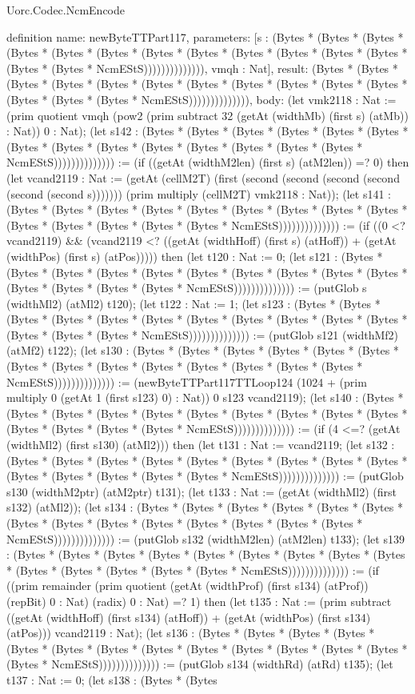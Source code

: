 \begin{lexlean}{Uorc.Codec.NcmEncode}
\begin{semanticmodule}
definition{
  name: newByteTTPart117,
  parameters: [s : (Bytes * (Bytes * (Bytes * (Bytes * (Bytes * (Bytes * (Bytes * (Bytes * (Bytes * (Bytes * (Bytes * (Bytes * (Bytes * (Bytes * NcmEStS)))))))))))))), vmqh : Nat],
  result: (Bytes * (Bytes * (Bytes * (Bytes * (Bytes * (Bytes * (Bytes * (Bytes * (Bytes * (Bytes * (Bytes * (Bytes * (Bytes * (Bytes * NcmEStS)))))))))))))),
  body: (let vmk2118 : Nat := (prim quotient vmqh (pow2 (prim subtract 32 (getAt (widthMb) (first s) (atMb)) : Nat)) 0 : Nat); (let s142 : (Bytes * (Bytes * (Bytes * (Bytes * (Bytes * (Bytes * (Bytes * (Bytes * (Bytes * (Bytes * (Bytes * (Bytes * (Bytes * (Bytes * NcmEStS)))))))))))))) := (if ((getAt (widthM2len) (first s) (atM2len)) =? 0) then (let vcand2119 : Nat := (getAt (cellM2T) (first (second (second (second (second (second (second s))))))) (prim multiply (cellM2T) vmk2118 : Nat)); (let s141 : (Bytes * (Bytes * (Bytes * (Bytes * (Bytes * (Bytes * (Bytes * (Bytes * (Bytes * (Bytes * (Bytes * (Bytes * (Bytes * (Bytes * NcmEStS)))))))))))))) := (if ((0 <? vcand2119) && (vcand2119 <? ((getAt (widthHoff) (first s) (atHoff)) + (getAt (widthPos) (first s) (atPos))))) then (let t120 : Nat := 0; (let s121 : (Bytes * (Bytes * (Bytes * (Bytes * (Bytes * (Bytes * (Bytes * (Bytes * (Bytes * (Bytes * (Bytes * (Bytes * (Bytes * (Bytes * NcmEStS)))))))))))))) := (putGlob s (widthMl2) (atMl2) t120); (let t122 : Nat := 1; (let s123 : (Bytes * (Bytes * (Bytes * (Bytes * (Bytes * (Bytes * (Bytes * (Bytes * (Bytes * (Bytes * (Bytes * (Bytes * (Bytes * (Bytes * NcmEStS)))))))))))))) := (putGlob s121 (widthMf2) (atMf2) t122); (let s130 : (Bytes * (Bytes * (Bytes * (Bytes * (Bytes * (Bytes * (Bytes * (Bytes * (Bytes * (Bytes * (Bytes * (Bytes * (Bytes * (Bytes * NcmEStS)))))))))))))) := (newByteTTPart117TTLoop124 (1024 + (prim multiply 0 (getAt 1 (first s123) 0) : Nat)) 0 s123 vcand2119); (let s140 : (Bytes * (Bytes * (Bytes * (Bytes * (Bytes * (Bytes * (Bytes * (Bytes * (Bytes * (Bytes * (Bytes * (Bytes * (Bytes * (Bytes * NcmEStS)))))))))))))) := (if (4 <=? (getAt (widthMl2) (first s130) (atMl2))) then (let t131 : Nat := vcand2119; (let s132 : (Bytes * (Bytes * (Bytes * (Bytes * (Bytes * (Bytes * (Bytes * (Bytes * (Bytes * (Bytes * (Bytes * (Bytes * (Bytes * (Bytes * NcmEStS)))))))))))))) := (putGlob s130 (widthM2ptr) (atM2ptr) t131); (let t133 : Nat := (getAt (widthMl2) (first s132) (atMl2)); (let s134 : (Bytes * (Bytes * (Bytes * (Bytes * (Bytes * (Bytes * (Bytes * (Bytes * (Bytes * (Bytes * (Bytes * (Bytes * (Bytes * (Bytes * NcmEStS)))))))))))))) := (putGlob s132 (widthM2len) (atM2len) t133); (let s139 : (Bytes * (Bytes * (Bytes * (Bytes * (Bytes * (Bytes * (Bytes * (Bytes * (Bytes * (Bytes * (Bytes * (Bytes * (Bytes * (Bytes * NcmEStS)))))))))))))) := (if ((prim remainder (prim quotient (getAt (widthProf) (first s134) (atProf)) (repBit) 0 : Nat) (radix) 0 : Nat) =? 1) then (let t135 : Nat := (prim subtract ((getAt (widthHoff) (first s134) (atHoff)) + (getAt (widthPos) (first s134) (atPos))) vcand2119 : Nat); (let s136 : (Bytes * (Bytes * (Bytes * (Bytes * (Bytes * (Bytes * (Bytes * (Bytes * (Bytes * (Bytes * (Bytes * (Bytes * (Bytes * (Bytes * NcmEStS)))))))))))))) := (putGlob s134 (widthRd) (atRd) t135); (let t137 : Nat := 0; (let s138 : (Bytes * (Bytes }
\end{semanticmodule}
\end{lexlean}
